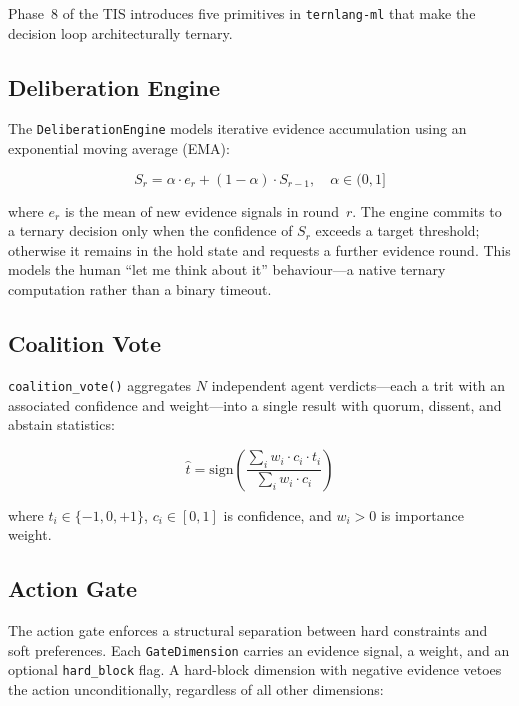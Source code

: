 \documentclass[11pt,a4paper]{article}
\begin{document}
Phase~8 of the TIS introduces five primitives in \texttt{ternlang-ml} that
make the decision loop architecturally ternary.

\subsection{Deliberation Engine}

The \texttt{DeliberationEngine} models iterative evidence accumulation using
an exponential moving average (EMA):

\begin{equation}
  S_r = \alpha \cdot e_r + (1-\alpha) \cdot S_{r-1},
  \quad \alpha \in (0, 1]
  \label{eq:ema}
\end{equation}

where $e_r$ is the mean of new evidence signals in round~$r$. The engine
commits to a ternary decision only when the confidence of $S_r$ exceeds a
target threshold; otherwise it remains in the hold state and requests a
further evidence round. This models the human ``let me think about it''
behaviour—a native ternary computation rather than a binary timeout.

\subsection{Coalition Vote}

\texttt{coalition\_vote()} aggregates $N$ independent agent verdicts—each a
trit with an associated confidence and weight—into a single result with
quorum, dissent, and abstain statistics:

\begin{equation}
  \hat{t} = \mathrm{sign}\!\left(
    \frac{\sum_i w_i \cdot c_i \cdot t_i}{\sum_i w_i \cdot c_i}
  \right)
  \label{eq:coalition}
\end{equation}

where $t_i \in \{-1,0,+1\}$, $c_i \in [0,1]$ is confidence, and
$w_i > 0$ is importance weight.

\subsection{Action Gate}

The action gate enforces a structural separation between hard constraints
and soft preferences. Each \texttt{GateDimension} carries an evidence
signal, a weight, and an optional \texttt{hard\_block} flag. A hard-block
dimension with negative evidence vetoes the action unconditionally,
regardless of all other dimensions:
\end{document}
